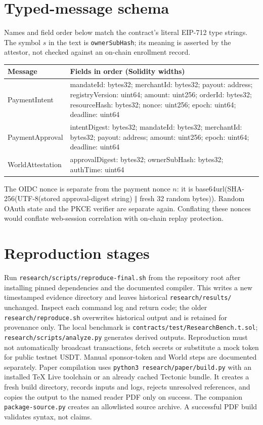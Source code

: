 \documentclass[11pt]{article}
\newcommand{\code}[1]{\nolinkurl{#1}}
\begin{document}
\section{Typed-message schema}\label{app:types}
Names and field order below match the contract's literal EIP-712 type strings. The symbol $s$ in the text is \code{ownerSubHash}; its meaning is asserted by the attestor, not checked against an on-chain enrollment record.
\begin{longtable}{p{.22\linewidth}p{.68\linewidth}}\toprule
Message & Fields in order (Solidity widths)\\\midrule
PaymentIntent & mandateId: bytes32; merchantId: bytes32; payout: address; registryVersion: uint64; amount: uint256; orderId: bytes32; resourceHash: bytes32; nonce: uint256; epoch: uint64; deadline: uint64\\
PaymentApproval & intentDigest: bytes32; mandateId: bytes32; merchantId: bytes32; payout: address; amount: uint256; epoch: uint64; deadline: uint64\\
WorldAttestation & approvalDigest: bytes32; ownerSubHash: bytes32; authTime: uint64\\\bottomrule
\end{longtable}
The OIDC nonce is separate from the payment nonce $n$: it is base64url(SHA-256(UTF-8(stored approval-digest string) $\Vert$ fresh 32 random bytes)). Random OAuth state and the PKCE verifier are separate again. Conflating these nonces would conflate web-session correlation with on-chain replay protection.

\section{Reproduction stages}
Run \code{research/scripts/reproduce-final.sh} from the repository root after installing pinned dependencies and the documented compiler. This writes a new timestamped evidence directory and leaves historical \code{research/results/} unchanged. Inspect each command log and return code; the older \code{research/reproduce.sh} overwrites historical output and is retained for provenance only. The local benchmark is \code{contracts/test/ResearchBench.t.sol}; \code{research/scripts/analyze.py} generates derived outputs. Reproduction must not automatically broadcast transactions, fetch secrets or substitute a mock token for public testnet USDT. Manual sponsor-token and World steps are documented separately. Paper compilation uses \texttt{python3}\ \code{research/paper/build.py} with an installed TeX Live toolchain or an already cached Tectonic bundle. It creates a fresh build directory, records inputs and logs, rejects unresolved references, and copies the output to the named reader PDF only on success. The companion \code{package-source.py} creates an allowlisted source archive. A successful PDF build validates syntax, not claims.
\end{document}
